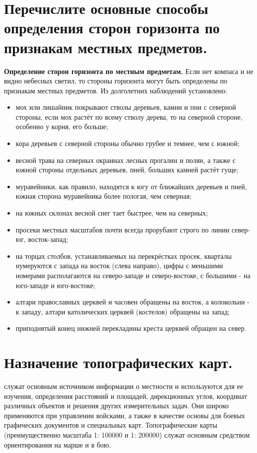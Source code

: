 \documentclass[12pt,a4paper]{report}
\begin{document}
\section{Перечислите основные способы определения сторон горизонта по признакам местных предметов.}
\textbf{ Определение сторон горизонта по местным предметам.}
 Если нет компаса и не видно небесных светил, то стороны горизонта могут быть определены по признакам местных предметов. Из долголетних наблюдений установлено:
 \begin{itemize}
 	\item     мох или лишайник покрывают стволы деревьев, камни и пни с северной стороны, если мох растёт по всему стволу дерева, то на северной стороне, особенно у корня, его больше;
 	\item     кора деревьев с северной стороны обычно грубее и темнее, чем с южной;
 	\item      весной трава на северных окраинах лесных прогалин и полян, а также с южной стороны отдельных деревьев, пней, больших камней растёт гуще;
 	\item      муравейники, как правило, находятся к югу от ближайших деревьев и пней, южная сторона муравейника более пологая, чем северная;
 	\item      на южных склонах весной снег тает быстрее, чем на северных;
 	\item      просеки местных масштабов почти всегда прорубают строго по линии север-юг, восток-запад;
 	\item      на торцах столбов, устанавливаемых на перекрёстках просек, кварталы нумеруются с запада на восток (слева направо), цифры с меньшими номерами располагаются на северо-западе и северо-востоке, с большими - на юго-западе и юго-востоке;
 	\item      алтари православных церквей и часовен обращены на восток, а колокольни - к западу, алтари католических церквей (костелов) обращены на запад;
 	\item приподнятый конец нижней перекладины креста церквей обращен на север.
 \end{itemize}
\section{Назначение топографических карт.}
\textbf{} служат основным источником информации о местности и используются для ее изучения, определения расстояний и площадей, дирекционных углов, координат различных объектов и решения других измерительных задач. Они широко применяются при управлении войсками, а также в качестве основы для боевых графических документов и специальных карт. Топографические карты (преимущественно масштаба 1: 100000 и 1: 200000) служат основным средством ориентирования на марше и в бою.
\end{document}
